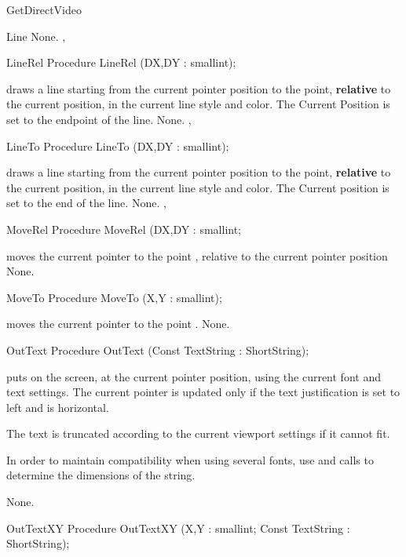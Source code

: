 \begin{function}{GetDirectVideo}
\begin{procedure}{Line}
\Errors
None.
\SeeAlso
{},
\end{procedure}
\begin{procedure}{LineRel}
\Declaration
Procedure LineRel (DX,DY : smallint);

\Description
{} draws a line starting from
the current pointer position to the point, \textbf{relative} to the
current position, in the current line style and color. The Current Position
is set to the endpoint of the line.
\Errors
None.
\SeeAlso
{}, 
\end{procedure}
\begin{procedure}{LineTo}
\Declaration
Procedure LineTo (DX,DY : smallint);

\Description
{} draws a line starting from
the current pointer position to the point, \textbf{relative} to the
current position, in the current line style and color. The Current position
is set to the end of the line.
\Errors
None.
\SeeAlso
{},
\end{procedure}
\begin{procedure}{MoveRel}
\Declaration
Procedure MoveRel (DX,DY : smallint;

\Description
{} moves the current pointer to the
point , relative to the current pointer
position
\Errors
None.
\SeeAlso
{}
\end{procedure}
\begin{procedure}{MoveTo}
\Declaration
Procedure MoveTo (X,Y : smallint);

\Description
{} moves the current pointer to the
point .
\Errors
None.
\SeeAlso
{}
\end{procedure}
\begin{procedure}{OutText}
\Declaration
Procedure OutText (Const TextString : ShortString);

\Description
{} puts  on the screen, at the current pointer
position, using the current font and text settings. The current pointer is
updated only if the text justification is set to left and is horizontal.

The text is truncated according to the current viewport settings if it
cannot fit.

In order to maintain compatibility when using several fonts, use 
and  calls to determine the dimensions of the string.

\Errors
None.
\SeeAlso
{}
\end{procedure}
\begin{procedure}{OutTextXY}
\Declaration
Procedure OutTextXY (X,Y : smallint; Const TextString : ShortString);


\end{procedure}
\end{function}
